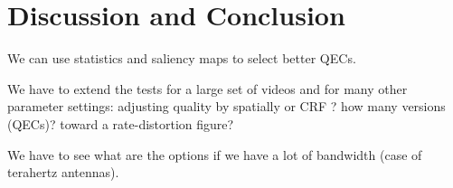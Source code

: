 \documentclass{sig-alternate}
\begin{document}
\section{Discussion and Conclusion}

We can use  statistics and saliency maps to select better \acp{QEC}.

We have to extend the tests for a large set of videos and for many other parameter settings: adjusting quality by spatially or CRF ? how many versions (QECs)? toward a rate-distortion figure?

We have to see what are the options if we have a lot of bandwidth (case of terahertz antennas).



\newpage
%
%

%

\end{document}
